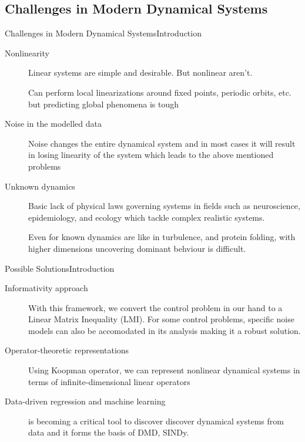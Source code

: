 \documentclass[aspectratio=169, handout, 10pt, hyperref=colorlinks]{beamer}
\begin{document}
\subsection{Challenges in Modern Dynamical Systems}
\begin{frame}{Challenges in Modern Dynamical Systems}{Introduction}
  \begin{description}
  \item[Nonlinearity]
  Linear systems are simple and desirable. But nonlinear aren't. 

  Can perform local linearizations around fixed points, periodic orbits, etc. but predicting global phenomena is tough
  \item[Noise in the modelled data]
  Noise changes the entire dynamical system and in most cases it will result in losing linearity of the system which leads to the above mentioned problems
  \item[Unknown dynamics] Basic lack of physical laws governing systems in fields such as neuroscience, epidemiology, and ecology which tackle complex realistic systems.

  Even for known dynamics are like in turbulence, and protein folding, with higher dimensions uncovering dominant behviour is difficult.
  \end{description}
\end{frame}
\begin{frame}{Possible Solutions}{Introduction}
  \begin{description}
    \item[Informativity approach] With this framework, we convert the control problem in our hand to a Linear Matrix Inequality (LMI). For some control problems, specific noise models can also be accomodated in its analysis making it a robust solution.
    \item[Operator-theoretic representations] Using Koopman operator, we can represent nonlinear dynamical systems in terms of infinite-dimensional linear operators
    \item[Data-driven regression and machine learning] is becoming a critical tool to discover discover dynamical systems from data and it forms the basis of DMD, SINDy.%
  \end{description}
\end{frame}
\end{document}
